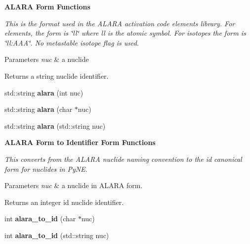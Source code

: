 \begin{Indent}{\bf A\+L\+A\+R\+A Form Functions}\par
{\em This is the format used in the A\+L\+A\+R\+A activation code elements library. For elements, the form is \char`\"{}ll\char`\"{} where ll is the atomic symbol. For isotopes the form is \char`\"{}ll\+:\+A\+A\+A\char`\"{}. No metastable isotope flag is used. 
\begin{DoxyParams}{Parameters}
{\em nuc} & a nuclide \\
\hline
\end{DoxyParams}
\begin{DoxyReturn}{Returns}
a string nuclide identifier. 
\end{DoxyReturn}
}\begin{DoxyCompactItemize}
\item 
\hypertarget{namespacepyne_1_1nucname_a6180f363d79c5865e19299a12bf6bc7f}{std\+::string {\bfseries alara} (int nuc)}\label{namespacepyne_1_1nucname_a6180f363d79c5865e19299a12bf6bc7f}

\item 
\hypertarget{namespacepyne_1_1nucname_a5ba5bc4bd02c919e860906376b452c8f}{std\+::string {\bfseries alara} (char $\ast$nuc)}\label{namespacepyne_1_1nucname_a5ba5bc4bd02c919e860906376b452c8f}

\item 
\hypertarget{namespacepyne_1_1nucname_a4317364d7f2fd4271d8d6d64a3844473}{std\+::string {\bfseries alara} (std\+::string nuc)}\label{namespacepyne_1_1nucname_a4317364d7f2fd4271d8d6d64a3844473}

\end{DoxyCompactItemize}
\end{Indent}
\begin{Indent}{\bf A\+L\+A\+R\+A Form to Identifier Form Functions}\par
{\em This converts from the A\+L\+A\+R\+A nuclide naming convention to the id canonical form for nuclides in Py\+N\+E. 
\begin{DoxyParams}{Parameters}
{\em nuc} & a nuclide in A\+L\+A\+R\+A form. \\
\hline
\end{DoxyParams}
\begin{DoxyReturn}{Returns}
an integer id nuclide identifier. 
\end{DoxyReturn}
}\begin{DoxyCompactItemize}
\item 
\hypertarget{namespacepyne_1_1nucname_a51250ed018402943cf7846ed18b6a1eb}{int {\bfseries alara\+\_\+to\+\_\+id} (char $\ast$nuc)}\label{namespacepyne_1_1nucname_a51250ed018402943cf7846ed18b6a1eb}

\item 
\hypertarget{namespacepyne_1_1nucname_aa9cbfbadae0f367edadd700a036d0c8a}{int {\bfseries alara\+\_\+to\+\_\+id} (std\+::string nuc)}\label{namespacepyne_1_1nucname_aa9cbfbadae0f367edadd700a036d0c8a}

\end{DoxyCompactItemize}
\end{Indent}
